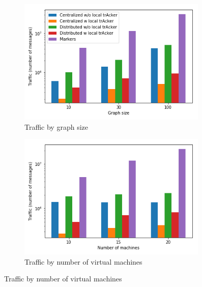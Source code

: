 \label {fs-experiments}

\begin{figure}[t!]
    \begin{subfigure}[b]{0.32\textwidth}
            \includegraphics[width=0.99\textwidth]{pics/traffic_by_graph_size_bars.png}
            \caption{Traffic by graph size}
            \label{traffic_graph}
    \end{subfigure}
    \hspace{5mm}
    \begin{subfigure}[b]{0.32\textwidth}
            \includegraphics[width=0.99\textwidth]{pics/traffic_by_number_of_machines_bars.png}
            \caption{Traffic by number of virtual machines}
            \label{traffic_machines}
    \end{subfigure}
    \hspace{5mm}

\end{figure}
